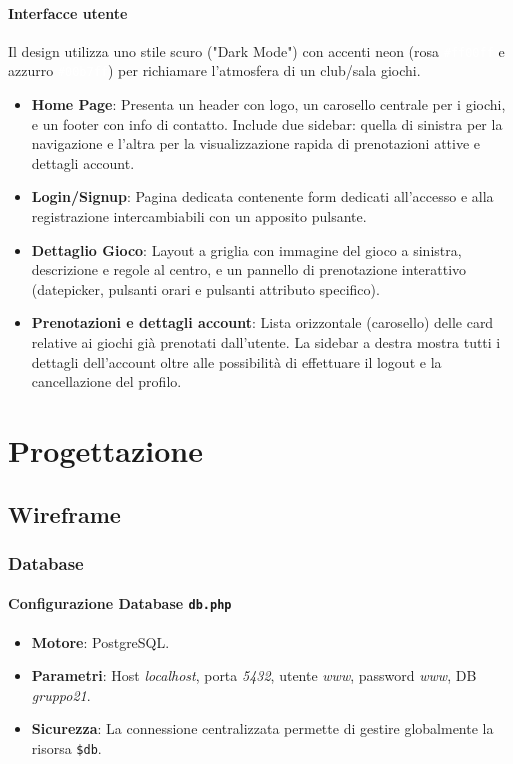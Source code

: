 \documentclass[a4paper, twoside]{report}
\begin{document}
\subsubsection*{Interfacce utente}
Il design utilizza uno stile scuro ("Dark Mode") con accenti neon (rosa \colorbox[HTML]{FF00FF}{\textcolor{white}{\texttt{\#ff00ff}}} e azzurro \colorbox[HTML]{00B7FF}{\textcolor{white}{\texttt{\#00b7ff}}}) per richiamare l'atmosfera di un club/sala giochi.
\begin{itemize}
  \item \textbf{Home Page}: Presenta un header con logo, un carosello centrale per i giochi, e un footer con info di contatto. Include due sidebar: quella di sinistra per la navigazione e l’altra per la visualizzazione rapida di prenotazioni attive e dettagli account.
  \item \textbf{Login/Signup}: Pagina dedicata contenente form dedicati all’accesso e alla registrazione intercambiabili con un apposito pulsante.
  \item \textbf{Dettaglio Gioco}: Layout a griglia con immagine del gioco a sinistra, descrizione e regole al centro, e un pannello di prenotazione interattivo (datepicker, pulsanti orari e pulsanti attributo specifico).
  \item \textbf{Prenotazioni e dettagli account}: Lista orizzontale (carosello) delle card relative ai giochi già prenotati dall’utente. La sidebar a destra mostra tutti i dettagli dell’account oltre alle possibilità di effettuare il logout e la cancellazione del profilo.
\end{itemize}

\chapter{Progettazione}
\section{Wireframe}
\subsection{Database}
\subsubsection*{Configurazione Database \texttt{db.php}}
\begin{itemize}
  \item \textbf{Motore}: PostgreSQL.
  \item \textbf{Parametri}: Host \textit{localhost}, porta \textit{5432}, utente \textit{www}, password \textit{www}, DB \textit{gruppo21}.
  \item \textbf{Sicurezza}: La connessione centralizzata permette di gestire globalmente la risorsa \texttt{\$db}.
\end{itemize}
\end{document}
